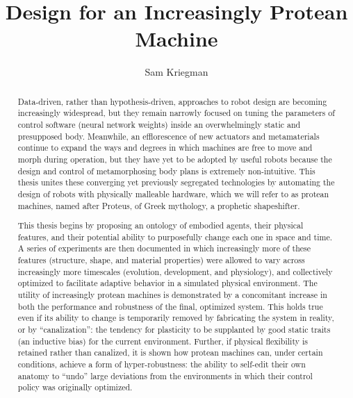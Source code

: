 \documentclass[12pt]{report}
\title{Design for an Increasingly Protean Machine}
\author{Sam Kriegman}
\begin{document}
\maketitle



\begin{abstract}
	
\vspace{10mm}


Data-driven, rather than hypothesis-driven, 
approaches to robot design are becoming increasingly widespread, but they remain narrowly focused on tuning the parameters of control software (neural network weights) inside an overwhelmingly static and presupposed body.
Meanwhile, an efflorescence of new actuators and metamaterials continue to expand the ways and degrees in which machines are free to 
move and morph
during operation, 
but they have yet to be adopted by useful robots because 
the design and control of 
metamorphosing body plans 
is extremely
non-intuitive.
This thesis unites these 
converging yet previously 
segregated
technologies
by automating the design of robots with physically malleable hardware,
which we will refer to as protean machines, named after Proteus, of Greek mythology, a prophetic shapeshifter.

This thesis begins by proposing an ontology of embodied agents, their physical features, and their potential ability to purposefully change each one in space and time.
A series of experiments are then documented in which increasingly more of these features (structure, shape, and material properties) were allowed to vary across increasingly more timescales (evolution, development, and physiology), and collectively optimized to facilitate 
adaptive
behavior in a simulated physical environment.
The utility of increasingly protean machines is demonstrated by a concomitant increase in both the performance and robustness of the final, optimized system.
This holds true even if its ability to change is temporarily removed by fabricating the system in reality, or by ``canalization'': the tendency for plasticity to be supplanted by good static traits (an inductive bias) for the current environment.
Further, if physical flexibility is retained rather than canalized, it is shown how protean machines can, under certain conditions, achieve a form of hyper-robustness: the ability to self-edit their own anatomy to ``undo'' large deviations from the environments in which their control policy was originally optimized.


\end{abstract}
\end{document}
